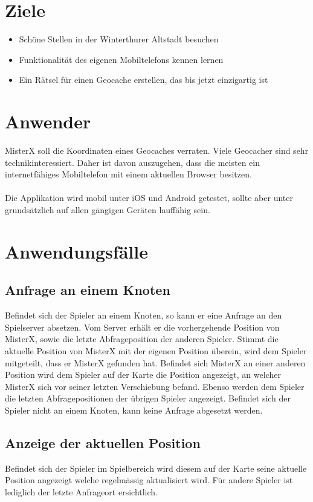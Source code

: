 \documentclass[11pt]{article}
\begin{document}
\section{Ziele}
\begin{itemize}
\item Schöne Stellen in der Winterthurer Altstadt besuchen
\item Funktionalität des eigenen Mobiltelefons kennen lernen
\item Ein Rätsel für einen Geocache erstellen, das bis jetzt einzigartig ist
\end{itemize}


\section{Anwender}
MisterX soll die Koordinaten eines Geocaches verraten. Viele Geocacher sind sehr technikinteressiert. Daher ist davon auszugehen, dass die meisten ein internetfähiges Mobiltelefon mit einem aktuellen Browser besitzen. 
\\\\
Die Applikation wird mobil unter iOS und Android getestet, sollte aber unter grundsätzlich auf allen gängigen Geräten lauffähig sein. 

\section{Anwendungsfälle}
\subsection{Anfrage an einem Knoten}
Befindet sich der Spieler an einem Knoten, so kann er eine Anfrage an den Spielserver absetzen. Vom Server erhält er die vorhergehende Position von MisterX, sowie die letzte Abfrageposition der anderen Spieler. Stimmt die aktuelle Position von MisterX mit der eigenen Position überein, wird dem Spieler mitgeteilt, dass er MisterX gefunden hat. Befindet sich MisterX an einer anderen Position wird dem Spieler auf der Karte die Position angezeigt, an welcher  MisterX sich vor seiner letzten Verschiebung befand. Ebenso werden dem Spieler die letzten Abfragepositionen der übrigen Spieler angezeigt.
Befindet sich der Spieler nicht an einem Knoten, kann keine Anfrage abgesetzt werden.

\subsection{Anzeige der aktuellen Position}
Befindet sich der Spieler im Spielbereich wird diesem auf der Karte seine aktuelle Position angezeigt welche regelmässig aktualisiert wird. Für andere Spieler ist lediglich der letzte Anfrageort ersichtlich.
\end{document}
